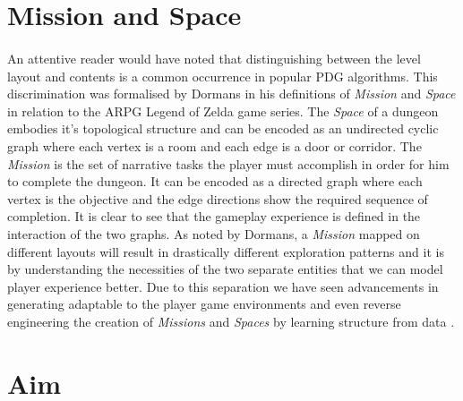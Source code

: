 \documentclass{UoYCSproject}
\begin{document}
\section{Mission and Space}

\paragraph{} %
An attentive reader would have noted that distinguishing between the level layout and contents is a common occurrence in popular PDG algorithms. This discrimination was formalised by Dormans\parencite{DormansMS} in his definitions of \textit{Mission} and \textit{Space} in relation to the ARPG Legend of Zelda game series.
The \textit{Space} of a dungeon embodies it's topological structure and can be encoded as an undirected cyclic graph where each vertex is a room and each edge is a door or corridor. The \textit{Mission} is the set of narrative tasks the player must accomplish in order for him to complete the dungeon. It can be encoded as a directed graph where each vertex is the objective and the edge directions show the required sequence of completion. It is clear to see that the gameplay experience is defined in the interaction of the two graphs. As noted by Dormans, a \textit{Mission} mapped on different layouts will result in drastically different exploration patterns and it is by understanding the necessities of the two separate entities that we can model player experience better. Due to this separation we have seen advancements in generating adaptable to the player game environments \parencite{DormansAE} and even reverse engineering the creation of \textit{Missions} and \textit{Spaces} by learning structure from data \parencite{SummervilleLearningOfZelda}.

\section{Aim}
\end{document}
